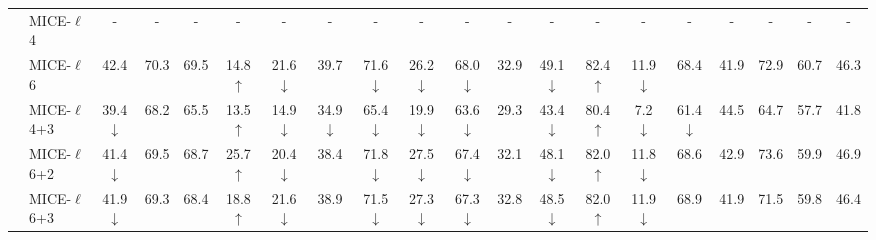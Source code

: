 \begin{table}[ht]
{\begin{tabular}{rlcccccccccccccccccc}
 & MICE-$\ell$4 & - & - & - & - & - & - & - & - & - & - & - & - & - & - & - & - & - & - \\
 & MICE-$\ell$6& 42.4 & 70.3 & 69.5 & 14.8 $\uparrow$ & 21.6 $\downarrow$ & 39.7 & 71.6 $\downarrow$ & 26.2 $\downarrow$ & 68.0 $\downarrow$ & 32.9 & 49.1 $\downarrow$ & 82.4 $\uparrow$ & 11.9 $\downarrow$ & 68.4 & 41.9 & 72.9 & 60.7 & 46.3 \\
 & MICE-$\ell$4+3& 39.4 $\downarrow$ & 68.2 & 65.5 & 13.5 $\uparrow$ & 14.9 $\downarrow$ & 34.9 $\downarrow$ & 65.4 $\downarrow$ & 19.9 $\downarrow$ & 63.6 $\downarrow$ & 29.3 & 43.4 $\downarrow$ & 80.4 $\uparrow$ & 7.2 $\downarrow$ & 61.4 $\downarrow$ & 44.5 & 64.7 & 57.7 & 41.8 \\
 & MICE-$\ell$6+2& 41.4 $\downarrow$ & 69.5 & 68.7 & 25.7 $\uparrow$ & 20.4 $\downarrow$ & 38.4 & 71.8 $\downarrow$ & 27.5 $\downarrow$ & 67.4 $\downarrow$ & 32.1 & 48.1 $\downarrow$ & 82.0 $\uparrow$ & 11.8 $\downarrow$ & 68.6 & 42.9 & 73.6 & 59.9 & 46.9 \\
 & MICE-$\ell$6+3& 41.9 $\downarrow$ & 69.3 & 68.4 & 18.8 $\uparrow$ & 21.6 $\downarrow$ & 38.9 & 71.5 $\downarrow$ & 27.3 $\downarrow$ & 67.3 $\downarrow$ & 32.8 & 48.5 $\downarrow$ & 82.0 $\uparrow$ & 11.9 $\downarrow$ & 68.9 & 41.9 & 71.5 & 59.8 & 46.4 \\
\bottomrule
\end{tabular}
}
\label{tab:MICE-evals}
\end{table}
